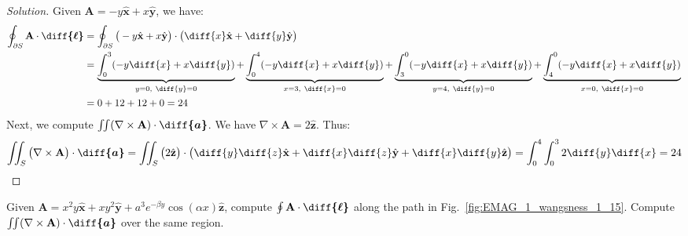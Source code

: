 \documentclass[crop=false,class=article,oneside]{standalone}
\begin{document}
        \begin{proof}[Solution]
            Given
            $\mathbf{A}=-y\hat{\mathbf{x}}+x\hat{\mathbf{y}}$,
            we have:
            \begin{align*}
                \oint_{\partial S}
                \mathbf{A}\cdot\boldsymbol{\diff{\ell}}
                &=\oint_{\partial{S}}\big(-y\hat{\mathbf{x}}
                +x\hat{\mathbf{y}}\big)
                \cdot\big(\diff{x}\hat{\mathbf{x}}
                +\diff{y}\hat{\mathbf{y}}\big)\\
                &=\underbrace{%
                    \int_{0}^{3}(-y\diff{x}+x\diff{y})
                }_{y=0,\ \diff{y}=0}
                +\underbrace{%
                    \int_{0}^{4}(-y\diff{x}+x\diff{y})
                }_{x=3,\ \diff{x}=0}
                +\underbrace{%
                    \int_{3}^{0}(-y\diff{x}+x\diff{y})
                }_{y=4,\ \diff{y}=0}
                +\underbrace{%
                    \int_{4}^{0}(-y\diff{x}+x\diff{y})
                }_{x=0,\ \diff{x}=0}\\
                &=0+12+12+0=24
            \end{align*}
            Next, we compute
            $\iint(\nabla\times\mathbf{A})%
             \cdot\boldsymbol{\diff{a}}$.
            We have
            $\nabla\times\mathbf{A}=%
             2\hat{\mathbf{z}}$.
            Thus:
            \begin{equation*}
                \iint_{S}\big(\nabla\times\mathbf{A}\big)
                \cdot\boldsymbol{\diff{a}}
                =\iint_{S}\big(2\hat{\mathbf{z}}\big)
                \cdot\big(\diff{y}\diff{z}\hat{\mathbf{x}}
                +\diff{x}\diff{z}\hat{\mathbf{y}}
                +\diff{x}\diff{y}\hat{\mathbf{z}}\big)
                =\int_{0}^{4}\int_{0}^{3}2\diff{y}\diff{x}
                =24
            \end{equation*}
        \end{proof}
        \begin{problem}[Wangsness 1-15]
            \label{problem:EMAG_1_wangsness_1_15}
            Given
            $\mathbf{A}%
             =x^{2}y\hat{\mathbf{x}}%
             +xy^{2}\hat{\mathbf{y}}%
             +a^{3}e^{-\beta{y}}\cos(\alpha{x})\hat{\mathbf{z}}$,
            compute
            $\oint\mathbf{A}\cdot\boldsymbol{\diff{\ell}}$
            along the path in Fig.~\ref{fig:EMAG_1_wangsness_1_15}.
            Compute
            $\iint(\nabla\times\mathbf{A})%
             \cdot\boldsymbol{\diff{a}}$
            over the same region.
        \end{problem}
\end{document}
